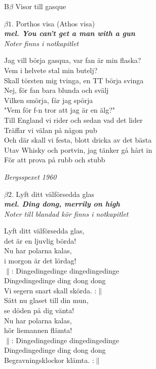 \documentclass[a6paper,10pt]{article}
\newcommand{\mel}[1]{\small\textbf{\textit{mel. #1 \\}}}
\begin{document}
\setlength{\oddsidemargin}{-0.47in}
\noindent
\huge{B$\beta$ Visor till gasque}
\begin{center}
\Large $\beta1$. Porthos visa (Athos visa) \\ 
\mel{You can't get a man with a gun}
\textit{Noter finns i notkapitlet}
\end{center}
\small Jag vill börja gasqua, var fan är min flaska?\\
Vem i helvete stal min butelj?\\
Skall törsten mig tvinga, en TT börja svinga\\
Nej, för fan bara blunda och svälj\\
Vilken smörja, får jag spörja\\
"Vem för f-n tror att jag är en älg?"\\
 \newline
Till England vi rider och sedan vad det lider\\
Träffar vi välan på någon pub\\
Och där skall vi festa, blott dricka av det bästa\\
Utav Whisky och portvin, jag tänker gå hårt in\\
För att prova på rubb och stubb
\begin{flushright}
   \textit{Bergsspexet 1960}
\end{flushright}
%

\setlength{\oddsidemargin}{-0.37in}
\begin{center}
\Large $\beta2$. Lyft ditt välförsedda glas \\ 
\mel{Ding dong, merrily on high} 
\textit{Noter till blandad kör finns i notkapitlet}
\end{center}
\small Lyft ditt välförsedda glas, \\
det är en ljuvlig börda! \\
Nu har polarna kalas, \\
i morgon är det lördag! \\
$\|$: Dingedingedinge dingedingedinge \\
Dingedingedinge ding dong dong \\
Vi segern snart skall skörda. :$\|$ \\
\newline
Sätt nu glaset till din mun, \\
se döden på dig vänta! \\
Nu har polarna kalas, \\
hör liemannen flämta! \\
$\|$: Dingedingedinge dingedingedinge \\
Dingedingedinge ding dong dong \\
Begravningsklockor klämta. :$\|$ 
\end{document}
